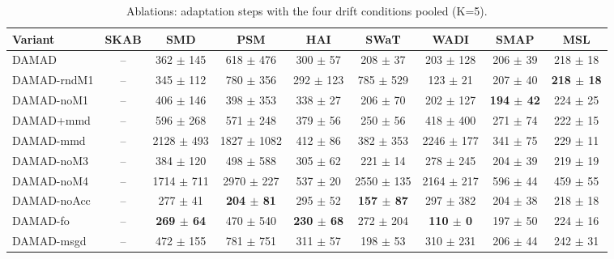 \begin{table}[t]
\centering
\small
\caption{Ablations: adaptation steps with the four drift conditions pooled (K=5).}
\label{tab:abl_adaptation_steps}
\begin{tabular}{lcccccccc}
\toprule
Variant & SKAB & SMD & PSM & HAI & SWaT & WADI & SMAP & MSL \\
\midrule
DAMAD & – & 362 $\pm$ 145 & 618 $\pm$ 476 & 300 $\pm$ 57 & 208 $\pm$ 37 & 203 $\pm$ 128 & 206 $\pm$ 39 & 218 $\pm$ 18 \\
DAMAD-rndM1 & – & 345 $\pm$ 112 & 780 $\pm$ 356 & 292 $\pm$ 123 & 785 $\pm$ 529 & 123 $\pm$ 21 & 207 $\pm$ 40 & \textbf{218 $\pm$ 18} \\
DAMAD-noM1 & – & 406 $\pm$ 146 & 398 $\pm$ 353 & 338 $\pm$ 27 & 206 $\pm$ 70 & 202 $\pm$ 127 & \textbf{194 $\pm$ 42} & 224 $\pm$ 25 \\
DAMAD+mmd & – & 596 $\pm$ 268 & 571 $\pm$ 248 & 379 $\pm$ 56 & 250 $\pm$ 56 & 418 $\pm$ 400 & 271 $\pm$ 74 & 222 $\pm$ 15 \\
DAMAD-mmd & – & 2128 $\pm$ 493 & 1827 $\pm$ 1082 & 412 $\pm$ 86 & 382 $\pm$ 353 & 2246 $\pm$ 177 & 341 $\pm$ 75 & 229 $\pm$ 11 \\
DAMAD-noM3 & – & 384 $\pm$ 120 & 498 $\pm$ 588 & 305 $\pm$ 62 & 221 $\pm$ 14 & 278 $\pm$ 245 & 204 $\pm$ 39 & 219 $\pm$ 19 \\
DAMAD-noM4 & – & 1714 $\pm$ 711 & 2970 $\pm$ 227 & 537 $\pm$ 20 & 2550 $\pm$ 135 & 2164 $\pm$ 217 & 596 $\pm$ 44 & 459 $\pm$ 55 \\
DAMAD-noAcc & – & 277 $\pm$ 41 & \textbf{204 $\pm$ 81} & 295 $\pm$ 52 & \textbf{157 $\pm$ 87} & 297 $\pm$ 382 & 204 $\pm$ 38 & 218 $\pm$ 18 \\
DAMAD-fo & – & \textbf{269 $\pm$ 64} & 470 $\pm$ 540 & \textbf{230 $\pm$ 68} & 272 $\pm$ 204 & \textbf{110 $\pm$ 0} & 197 $\pm$ 50 & 224 $\pm$ 16 \\
DAMAD-msgd & – & 472 $\pm$ 155 & 781 $\pm$ 751 & 311 $\pm$ 57 & 198 $\pm$ 53 & 310 $\pm$ 231 & 206 $\pm$ 44 & 242 $\pm$ 31 \\
\bottomrule
\end{tabular}
\end{table}

